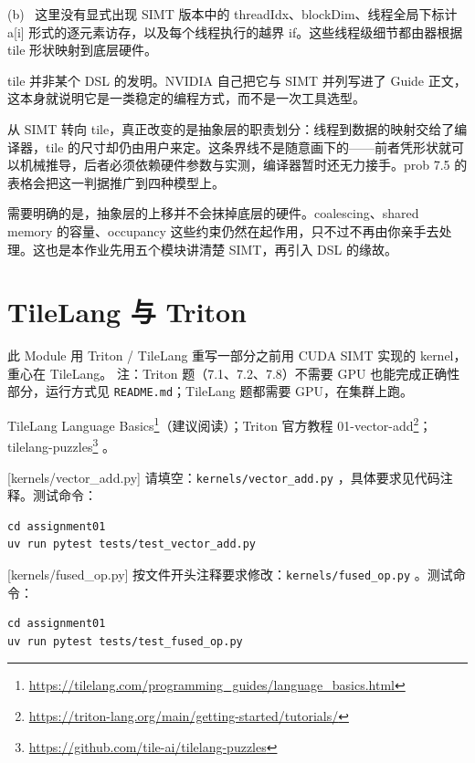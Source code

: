 \documentclass[11pt,a4paper,fontset=none]{ctexart}
\begin{document}
(b)~ 这里没有显式出现 SIMT 版本中的 threadIdx、blockDim、线程全局下标计 a[i] 形式的逐元素访存，以及每个线程执行的越界 if。这些线程级细节都由器根据 tile 形状映射到底层硬件。

\begin{lookback}
  tile 并非某个 DSL 的发明。NVIDIA 自己把它与 SIMT 并列写进了 Guide 正文，这本身就说明它是一类稳定的编程方式，而不是一次工具选型。

  从 SIMT 转向 tile，真正改变的是抽象层的职责划分：线程到数据的映射交给了编译器，tile 的尺寸却仍由用户来定。这条界线不是随意画下的——前者凭形状就可以机械推导，后者必须依赖硬件参数与实测，编译器暂时还无力接手。prob 7.5 的表格会把这一判据推广到四种模型上。

  需要明确的是，抽象层的上移并不会抹掉底层的硬件。coalescing、shared memory 的容量、occupancy 这些约束仍然在起作用，只不过不再由你亲手去处理。这也是本作业先用五个模块讲清楚 SIMT，再引入 DSL 的缘故。
\end{lookback}

\section{TileLang 与 Triton}

此 Module 用 Triton / TileLang 重写一部分之前用 CUDA SIMT 实现的 kernel，重心在 TileLang。
注：Triton 题（7.1、7.2、7.8）不需要 GPU 也能完成正确性部分，运行方式见 \texttt{README.md}；TileLang 题都需要 GPU，在集群上跑。

\begin{reading}
  TileLang Language Basics\footnote{\url{https://tilelang.com/programming_guides/language_basics.html}}（建议阅读）；Triton 官方教程 01-vector-add\footnote{\url{https://triton-lang.org/main/getting-started/tutorials/}}；tilelang-puzzles\footnote{\url{https://github.com/tile-ai/tilelang-puzzles}} 。
\end{reading}

[kernels/vector\_add.py]
请填空：\texttt{kernels/vector\_add.py} ，具体要求见代码注释。测试命令：

\begin{lstlisting}
cd assignment01
uv run pytest tests/test_vector_add.py
\end{lstlisting}

[kernels/fused\_op.py]
按文件开头注释要求修改：\texttt{kernels/fused\_op.py} 。测试命令：

\begin{lstlisting}
cd assignment01
uv run pytest tests/test_fused_op.py
\end{lstlisting}
\end{document}
